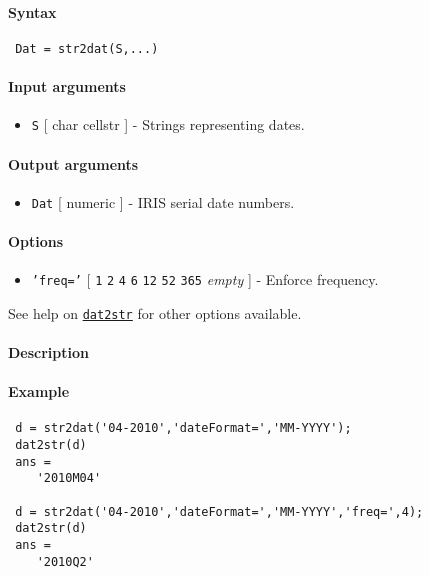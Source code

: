 


	\paragraph{Syntax}
 
 \begin{verbatim}
 Dat = str2dat(S,...)
 \end{verbatim}
 
 \paragraph{Input arguments}
 
 \begin{itemize}
 \item
   \texttt{S} {[} char \textbar{} cellstr {]} - Strings representing
   dates.
 \end{itemize}
 
 \paragraph{Output arguments}
 
 \begin{itemize}
 \item
   \texttt{Dat} {[} numeric {]} - IRIS serial date numbers.
 \end{itemize}
 
 \paragraph{Options}
 
 \begin{itemize}
 \item
   \texttt{'freq='} {[} \texttt{1} \textbar{} \texttt{2} \textbar{}
   \texttt{4} \textbar{} \texttt{6} \textbar{} \texttt{12} \textbar{}
   \texttt{52} \textbar{} \texttt{365} \textbar{} \emph{empty} {]} -
   Enforce frequency.
 \end{itemize}
 
 See help on \href{dates/dat2str}{\texttt{dat2str}} for other options
 available.
 
 \paragraph{Description}
 
 \paragraph{Example}
 
 \begin{verbatim}
 d = str2dat('04-2010','dateFormat=','MM-YYYY');
 dat2str(d)
 ans =
    '2010M04'
 
 d = str2dat('04-2010','dateFormat=','MM-YYYY','freq=',4);
 dat2str(d)
 ans =
    '2010Q2'
 \end{verbatim}


